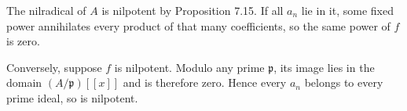 The nilradical of $A$ is nilpotent by Proposition 7.15. If all $a_n$ lie in it, some fixed power annihilates every product of that many coefficients, so the same power of $f$ is zero.

Conversely, suppose $f$ is nilpotent. Modulo any prime $\mathfrak{p}$, its image lies in the domain $(A/\mathfrak{p})[[x]]$ and is therefore zero. Hence every $a_n$ belongs to every prime ideal, so is nilpotent.
